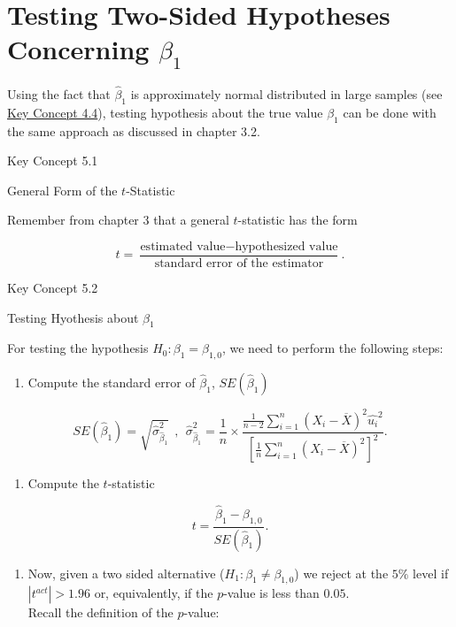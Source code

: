 \documentclass[]{book}
\providecommand{\tightlist}{%
  \setlength{\itemsep}{0pt}\setlength{\parskip}{0pt}}
\theoremstyle{definition}
\theoremstyle{definition}
\theoremstyle{definition}
\theoremstyle{remark}
\begin{document}
\section{\texorpdfstring{Testing Two-Sided Hypotheses Concerning
\(\beta_1\)}{Testing Two-Sided Hypotheses Concerning \textbackslash{}beta\_1}}\label{testing-two-sided-hypotheses-concerning-beta_1}

Using the fact that \(\hat{\beta}_1\) is approximately normal
distributed in large samples (see \protect\hyperlink{tsdotoe}{Key
Concept 4.4}), testing hypothesis about the true value \(\beta_1\) can
be done with the same approach as discussed in chapter 3.2.

Key Concept 5.1

General Form of the \(t\)-Statistic

Remember from chapter 3 that a general \(t\)-statistic has the form

\[
  t = \frac{\text{estimated value} - \text{hypothesized value}}{\text{standard error of the estimator}}.
\]

Key Concept 5.2

Testing Hyothesis about \(\beta_1\)

For testing the hypothesis \(H_0: \beta_1 = \beta_{1,0}\), we need to
perform the following steps:

\begin{enumerate}
\def\labelenumi{\arabic{enumi}.}
\tightlist
\item
  Compute the standard error of \(\hat{\beta}_1\), \(SE(\hat{\beta}_1)\)
\end{enumerate}

\[ SE(\hat{\beta}_1) = \sqrt{ \hat{\sigma}^2_{\hat{\beta}_1} } \ \ , \ \ 
  \hat{\sigma}^2_{\hat{\beta}_1} = \frac{1}{n} \times \frac{\frac{1}{n-2} \sum_{i=1}^n (X_i - \overline{X})^2 \hat{u_i}^2 }{ \left[ \frac{1}{n} \sum_{i=1}^n (X_i - \overline{X})^2 \right]^2}.
\]

\begin{enumerate}
\def\labelenumi{\arabic{enumi}.}
\setcounter{enumi}{1}
\tightlist
\item
  Compute the \(t\)-statistic
\end{enumerate}

\[ t = \frac{\hat{\beta}_1 - \beta_{1,0}}{ SE(\hat{\beta}_1) }. \]

\begin{enumerate}
\def\labelenumi{\arabic{enumi}.}
\setcounter{enumi}{2}
\tightlist
\item
  Now, given a two sided alternative (\(H_1:\beta_1 \neq \beta_{1,0}\))
  we reject at the \(5\%\) level if \(|t^{act}| > 1.96\) or,
  equivalently, if the \(p\)-value is less than \(0.05\).\\
  Recall the definition of the \(p\)-value:
\end{enumerate}
\end{document}
